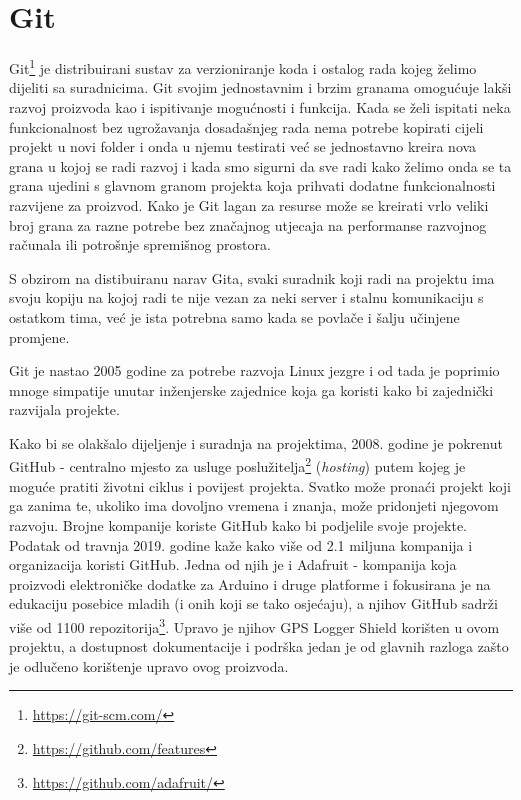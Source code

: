\section{Git}
Git\footnote{\href{https://git-scm.com/}{https://git-scm.com/}} je distribuirani sustav za verzioniranje koda i ostalog rada kojeg želimo dijeliti sa suradnicima.
Git svojim jednostavnim i brzim granama omogućuje lakši razvoj proizvoda kao i ispitivanje mogućnosti i funkcija.
Kada se želi ispitati neka funkcionalnost bez ugrožavanja dosadašnjeg rada nema potrebe kopirati cijeli projekt u novi folder i onda u njemu testirati već se jednostavno kreira nova grana u kojoj se radi razvoj i kada smo sigurni da sve radi kako želimo onda se ta grana ujedini s glavnom granom projekta koja prihvati dodatne funkcionalnosti razvijene za proizvod.
Kako je Git lagan za resurse može se kreirati vrlo veliki broj grana za razne potrebe bez značajnog utjecaja na performanse razvojnog računala ili potrošnje spremišnog prostora.

S obzirom na distibuiranu narav Gita, svaki suradnik koji radi na projektu ima svoju kopiju na kojoj radi te nije vezan za neki server i stalnu komunikaciju s ostatkom tima, već je ista potrebna samo kada se povlače i šalju učinjene promjene.

Git je nastao 2005 godine za potrebe razvoja Linux jezgre i od tada je poprimio mnoge simpatije unutar inženjerske zajednice koja ga koristi kako bi zajednički razvijala projekte.

Kako bi se olakšalo dijeljenje i suradnja na projektima, 2008. godine je pokrenut GitHub - centralno mjesto za usluge poslužitelja\footnote{\href{https://github.com/features}{https://github.com/features}} (\textit{hosting}) putem kojeg je moguće pratiti životni ciklus i povijest projekta.
Svatko može pronaći projekt koji ga zanima te, ukoliko ima dovoljno vremena i znanja, može pridonjeti njegovom razvoju.
Brojne kompanije koriste GitHub kako bi podjelile svoje projekte. Podatak od travnja 2019. godine kaže kako više od 2.1 miljuna kompanija i organizacija koristi GitHub.
Jedna od njih je i Adafruit - kompanija koja proizvodi elektroničke dodatke za Arduino i druge platforme i fokusirana je na edukaciju posebice mladih (i onih koji se tako osjećaju), a njihov GitHub sadrži više od 1100 repozitorija\footnote{\href{https://github.com/adafruit}{https://github.com/adafruit/}}.
Upravo je njihov GPS Logger Shield korišten u ovom projektu, a dostupnost dokumentacije i podrška jedan je od glavnih razloga zašto je odlučeno korištenje upravo ovog proizvoda.
